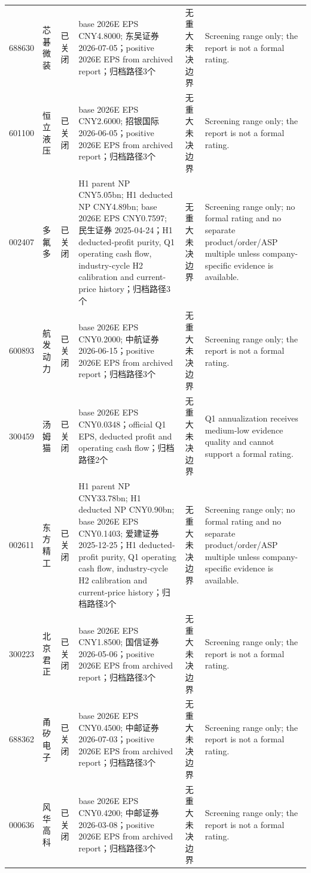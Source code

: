 \begin{longtable}{L{1.00cm}L{1.40cm}L{1.45cm}L{2.85cm}L{2.50cm}L{3.05cm}}
688630 & 芯碁微装 & 已关闭 & base 2026E EPS CNY4.8000; 东吴证券 2026-07-05；positive 2026E EPS from archived report；归档路径3个 & 无重大未决边界 & Screening range only; the report is not a formal rating. \\
601100 & 恒立液压 & 已关闭 & base 2026E EPS CNY2.6000; 招银国际 2026-06-05；positive 2026E EPS from archived report；归档路径3个 & 无重大未决边界 & Screening range only; the report is not a formal rating. \\
002407 & 多氟多 & 已关闭 & H1 parent NP CNY5.05bn; H1 deducted NP CNY4.89bn; base 2026E EPS CNY0.7597; 民生证券 2025-04-24；H1 deducted-profit purity, Q1 operating cash flow, industry-cycle H2 calibration and current-price history；归档路径3个 & 无重大未决边界 & Screening range only; no formal rating and no separate product/order/ASP multiple unless company-specific evidence is available. \\
600893 & 航发动力 & 已关闭 & base 2026E EPS CNY0.2000; 中航证券 2026-06-15；positive 2026E EPS from archived report；归档路径3个 & 无重大未决边界 & Screening range only; the report is not a formal rating. \\
300459 & 汤姆猫 & 已关闭 & base 2026E EPS CNY0.0348；official Q1 EPS, deducted profit and operating cash flow；归档路径2个 & 无重大未决边界 & Q1 annualization receives medium-low evidence quality and cannot support a formal rating. \\
002611 & 东方精工 & 已关闭 & H1 parent NP CNY33.78bn; H1 deducted NP CNY0.90bn; base 2026E EPS CNY0.1403; 爱建证券 2025-12-25；H1 deducted-profit purity, Q1 operating cash flow, industry-cycle H2 calibration and current-price history；归档路径3个 & 无重大未决边界 & Screening range only; no formal rating and no separate product/order/ASP multiple unless company-specific evidence is available. \\
300223 & 北京君正 & 已关闭 & base 2026E EPS CNY1.8500; 国信证券 2026-05-06；positive 2026E EPS from archived report；归档路径3个 & 无重大未决边界 & Screening range only; the report is not a formal rating. \\
688362 & 甬矽电子 & 已关闭 & base 2026E EPS CNY0.4500; 中邮证券 2026-07-03；positive 2026E EPS from archived report；归档路径3个 & 无重大未决边界 & Screening range only; the report is not a formal rating. \\
000636 & 风华高科 & 已关闭 & base 2026E EPS CNY0.4200; 中邮证券 2026-03-08；positive 2026E EPS from archived report；归档路径3个 & 无重大未决边界 & Screening range only; the report is not a formal rating. \\

\end{longtable}
